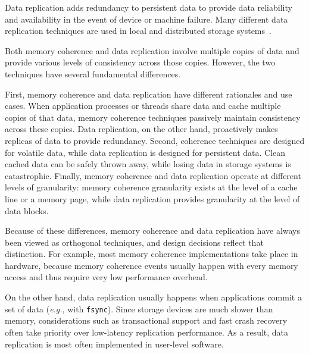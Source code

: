 \documentclass[sigconf]{acmart}
\newcommand{\eg}{\textit{e.g.}}
\newcommand{\fsync}{\texttt{fsync}}
\begin{document}
Data replication adds redundancy to persistent data to provide data reliability and availability
in the event of device or machine failure.
Many different data replication techniques  
are used in local and distributed storage
systems~\cite{AdyaEtAl-Farsite,calder11-azure,DeCandia+07-Dynamo,Ghemawat03-GoogleFS,Gray96-Danger,HellersteinEtAl94-Coding,KubiEtAl00-Ocean,PattersonEtAl88-RAID,Petersen97-Bayou,Rhea03-Pond,Rowstron01-PAST,vanRenesse04-OSDI,Zhong08-Replication}.

Both memory coherence and data replication involve multiple copies of data
and provide various levels of consistency across those copies.
However, the two techniques have several fundamental differences. 

First, memory coherence and data replication have different rationales and use cases.
When application processes or threads share data and cache multiple copies of that data, 
memory coherence techniques passively maintain consistency across these copies.
Data replication, on the other hand, proactively makes replicas of data to provide redundancy.
Second, coherence techniques are designed for volatile data, 
while data replication is designed for persistent data.
Clean cached data can be safely thrown away, while losing data in storage systems is catastrophic.
Finally, memory coherence and data replication operate at different levels of granularity:  
memory coherence granularity exists at the level of a cache line or a memory page, 
while data replication provides granularity at the level of data blocks.


Because of these differences, memory coherence and data replication have always been viewed as orthogonal techniques,
and design decisions reflect that distinction. 
For example, most memory coherence implementations take place in hardware, because memory coherence events usually happen with every memory access
and thus require very low performance overhead.

On the other hand, data replication usually happens when applications commit a set of data (\eg, with \fsync).
Since storage devices are much slower than memory, considerations such as transactional support and 
fast crash recovery often take priority over low-latency replication performance.
As a result,  data replication is most often implemented in user-level software.
\end{document}

